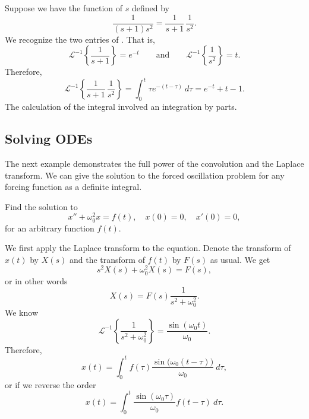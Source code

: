 \begin{example}
Suppose we have the function of $s$
defined by
\begin{equation*}
\frac{1}{(s+1)s^2} = 
\frac{1}{s+1}\,
\frac{1}{s^2} .
\end{equation*}
We recognize the two entries of .  That is,
\begin{equation*}
\mathcal{L}^{-1} 
\left\{
\frac{1}{s+1} \right\}
= e^{-t}
\qquad \text{and} \qquad
\mathcal{L}^{-1} 
\left\{
\frac{1}{s^2} \right\} 
= t.
\end{equation*}
Therefore,
\begin{equation*}
\mathcal{L}^{-1}
\left\{
\frac{1}{s+1}\,
\frac{1}{s^2} \right\}
=
\int_0^t
\tau e^{-(t-\tau)} ~d\tau
=
e^{-t}+t-1 .
\end{equation*}
The calculation of the integral involved an integration by parts.
\end{example}

\subsection{Solving ODEs}

The next example demonstrates the full power of the convolution and
the Laplace transform.  We can give the solution to
the forced oscillation problem for any forcing function as a definite
integral.

\begin{example} \label{example:undampedforcedbylaplacearbitrhs}
Find the solution to
\begin{equation*}
x'' + \omega_0^2 x = f(t) , \quad x(0) = 0, \quad x'(0) = 0 ,
\end{equation*}
for an arbitrary function $f(t)$.

We first apply the Laplace transform to the equation.  Denote
the transform of $x(t)$ by $X(s)$ and the transform of $f(t)$ by
$F(s)$ as usual.  We get
\begin{equation*}
s^2 X(s) + \omega_0^2 X(s) = F(s) ,
\end{equation*}
or in other words
\begin{equation*}
X(s) = F(s) \frac{1}{s^2+ \omega_0^2} .
\end{equation*}
We know
\begin{equation*}
{\mathcal{L}}^{-1} \left\{
\frac{1}{s^2+ \omega_0^2}
\right\} = 
\frac{\sin (\omega_0 t)}{\omega_0} .
\end{equation*}
Therefore,
\begin{equation*}
x(t) = 
\int_0^t
f(\tau) 
\frac{\sin \bigl( \omega_0 (t-\tau) \bigr)}{\omega_0} ~ d\tau ,
\end{equation*}
or if we reverse the order
\begin{equation*}
x(t) = 
\int_0^t
\frac{\sin (\omega_0 \tau)}{\omega_0}
f(t-\tau) ~ d\tau .
\end{equation*}
\end{example}


